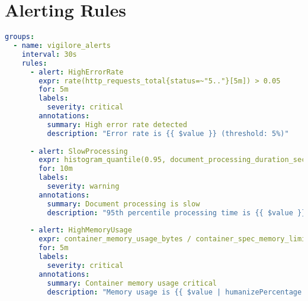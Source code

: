 \documentclass[12pt,a4paper]{report}
\begin{document}
\section{Alerting Rules}

\begin{lstlisting}[language=YAML, caption=Prometheus Alert Configuration]
groups:
  - name: vigilore_alerts
    interval: 30s
    rules:
      - alert: HighErrorRate
        expr: rate(http_requests_total{status=~"5.."}[5m]) > 0.05
        for: 5m
        labels:
          severity: critical
        annotations:
          summary: High error rate detected
          description: "Error rate is {{ $value }} (threshold: 5%)"
      
      - alert: SlowProcessing
        expr: histogram_quantile(0.95, document_processing_duration_seconds) > 300
        for: 10m
        labels:
          severity: warning
        annotations:
          summary: Document processing is slow
          description: "95th percentile processing time is {{ $value }}s"
      
      - alert: HighMemoryUsage
        expr: container_memory_usage_bytes / container_spec_memory_limit_bytes > 0.9
        for: 5m
        labels:
          severity: critical
        annotations:
          summary: Container memory usage critical
          description: "Memory usage is {{ $value | humanizePercentage }}"
\end{lstlisting}
\end{document}
